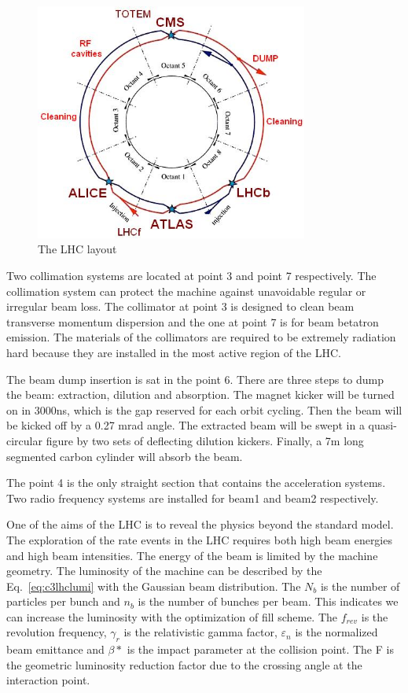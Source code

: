 \begin{figure}[htbp]
 \begin{center}
  \includegraphics[width=0.8\textwidth]{figures/c3/c3_lhc_latticelayout.jpg}
 \end{center}
 \caption{The LHC layout}
 \label{fig:c3lhclayout}
\end{figure}

Two collimation systems are located at point 3 and point 7 respectively. The collimation system can protect the machine against unavoidable regular or irregular beam loss. The collimator at point 3 is designed to clean beam transverse momentum dispersion and the one at point 7 is for beam betatron emission. The materials of the collimators are required to be extremely radiation hard because they are installed in the most active region of the LHC. 

The beam dump insertion is sat in the point 6. There are three steps to dump the beam: extraction, dilution and absorption. The magnet kicker will be turned on in 3000ns, which is the gap reserved for each orbit cycling. Then the beam will be kicked off by a 0.27 mrad angle. The extracted beam will be swept in a quasi-circular figure by two sets of deflecting dilution kickers. Finally, a 7m long segmented carbon cylinder will absorb the beam.

The point 4 is the only straight section that contains the acceleration systems. Two radio frequency systems are installed for beam1 and beam2 respectively. 

One of the aims of the LHC is to reveal the physics beyond the standard model. The exploration of the rate events in the LHC requires both high beam energies and high beam intensities. The energy of the beam is limited by the machine geometry. The luminosity of the machine can be described by the Eq.~\ref{eq:c3lhclumi} with the Gaussian beam distribution. The $N_{b}$ is the number of particles per bunch and $n_{b}$ is the number of bunches per beam. This indicates we can increase the luminosity with the optimization of fill scheme. The $f_{rev}$ is the revolution frequency, $\gamma_{r}$ is the relativistic gamma factor, $\varepsilon_{n}$ is the normalized beam emittance and $\beta *$ is the impact parameter at the collision point. The F is the geometric luminosity reduction factor due to the crossing angle at the interaction point. 

